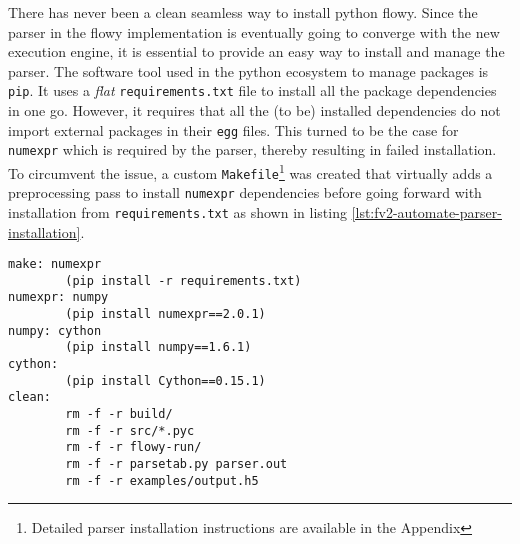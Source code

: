 There has never been a clean seamless way to install python flowy.  Since the
parser in the flowy implementation is eventually going to converge with the
new execution engine, it is essential to provide an easy way to install and
manage the parser. The software tool used in the python ecosystem to manage
packages is \texttt{pip}. It uses a \emph{flat}  \texttt{requirements.txt} file to install all the package dependencies
in one go. However, it requires that all the (to be) installed dependencies do
not import external packages in their \texttt{egg} files. This turned to be
the case for \texttt{numexpr} which is required by the parser, thereby
resulting in failed installation.  To circumvent the issue, a custom
\texttt{Makefile}\footnote{Detailed parser installation instructions are
available in the Appendix} was created that virtually adds a preprocessing
pass to install \texttt{numexpr} dependencies before going forward with
installation from \texttt{requirements.txt} as shown in listing
\ref{lst:fv2-automate-parser-installation}.

\begin{lstlisting}
make: numexpr
        (pip install -r requirements.txt)
numexpr: numpy
        (pip install numexpr==2.0.1)
numpy: cython
        (pip install numpy==1.6.1)
cython:
        (pip install Cython==0.15.1)
clean:
        rm -f -r build/
        rm -f -r src/*.pyc
        rm -f -r flowy-run/
        rm -f -r parsetab.py parser.out
        rm -f -r examples/output.h5
\end{lstlisting}
